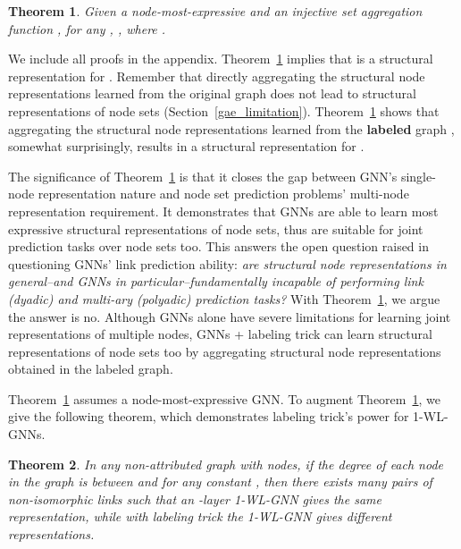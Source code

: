 \documentclass{article}
\newtheorem{theorem}{Theorem}
\begin{document}
\begin{theorem}\label{labeltrickthm}
Given a node-most-expressive  and an injective set aggregation function , for any , , where .
\end{theorem}


We include all proofs in the appendix. 
Theorem~\ref{labeltrickthm} implies that  is a structural representation for . Remember that directly aggregating the structural node representations learned from the original graph  does not lead to structural representations of node sets (Section~\ref{gae_limitation}). Theorem~\ref{labeltrickthm} shows that aggregating the structural node representations learned from the \textbf{labeled} graph , somewhat surprisingly, results in a structural representation for . 


The significance of Theorem~\ref{labeltrickthm} is that it closes the gap between GNN's single-node representation nature and node set prediction problems' multi-node representation requirement. It demonstrates that GNNs are able to learn most expressive structural representations of node sets, thus are suitable for joint prediction tasks over node sets too. This answers the open question raised in \citep{Srinivasan2020On} questioning GNNs' link prediction ability: \textit{are structural node representations in general--and GNNs in particular--fundamentally incapable of performing link (dyadic) and multi-ary (polyadic) prediction tasks?} With Theorem~\ref{labeltrickthm}, we argue the answer is no. Although GNNs alone have severe limitations for learning joint representations of multiple nodes, GNNs + labeling trick can learn structural representations of node sets too by aggregating structural node representations obtained in the labeled graph.




















Theorem~\ref{labeltrickthm} assumes a node-most-expressive GNN. To augment Theorem~\ref{labeltrickthm}, we give the following theorem, which demonstrates labeling trick's power for 1-WL-GNNs.

\begin{theorem} \label{thm:link-aso-num}
In any non-attributed graph with  nodes, if the degree of each node in the graph is between  and  for any constant , then there exists  many pairs of non-isomorphic links  such that an -layer \textnormal{1-WL-GNN} gives  the same representation, while with labeling trick the \textnormal{1-WL-GNN} gives  different representations.
\end{theorem}
\end{document}
